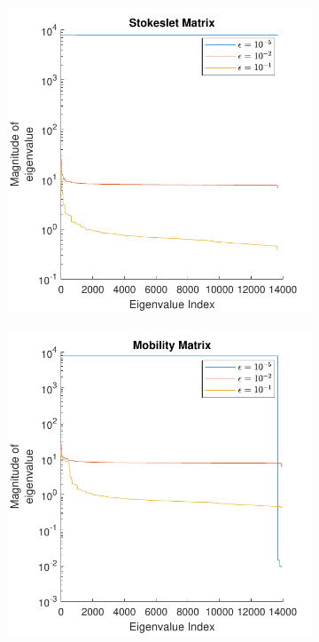 \begin{figure}
\caption[Eigenvalues of matrices considered in this paper.]{Eigenvalues of matrices considered in this paper for the case of 40 swimmers and 114 force quadrature points.}
    \begin{subfigure}{0.45\textwidth}
        \centering
        \includegraphics[width=\linewidth]{Images/Condition/Eigen-Stokeslet Matrix.pdf}
    \end{subfigure}
    \hfill
    \begin{subfigure}{0.45\textwidth}
        \centering
        \includegraphics[width=\linewidth]{Images/Condition/Eigen-Mobility Matrix.pdf}

\end{subfigure}
\end{figure}
